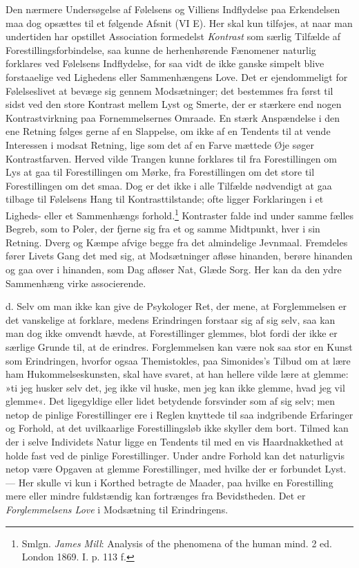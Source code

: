 \documentclass[12pt,a4paper,openany]{book}
\newcommand{\opage}[1]{\marginnote{\footnotesize\textit{[#1]}}}
\begin{document}
Den nærmere Undersøgelse af Følelsens og Villiens Indflydelse paa
Erkendelsen maa dog opsættes til et følgende Afsnit (VI E). Her skal kun
tilføjes, at naar man undertiden har opstillet Association formedelst
\emph{Kontrast} som særlig Tilfælde af Forestillingsforbindelse, saa
kunne de herhenhørende Fænomener naturlig forklares ved Følelsens
Indflydelse, for saa vidt de ikke ganske simpelt blive forstaaelige ved
Lighedens eller Sammenhængens Love. Det er ejendommeligt for
Følelseslivet at bevæge sig gennem Modsætninger; det bestemmes fra først
til sidst ved den store Kontrast mellem Lyst og Smerte, der er stærkere
end nogen Kontrastvirkning paa Fornemmelsernes Omraade. En stærk
Anspændelse i den ene Retning følges gerne af en Slappelse, om ikke af
en Tendents til at vende Interessen i modsat Retning, lige som det af en
Farve mættede Øje søger Kontrastfarven. Herved vilde Trangen kunne
forklares til fra Forestillingen om Lys at gaa til Forestillingen om
Mørke, fra Forestillingen om det store til Forestillingen om det smaa.
Dog er det ikke i alle Tilfælde nødvendigt at gaa tilbage til Følelsens
Hang til Kontrasttilstande; ofte ligger Forklaringen i et Ligheds- eller
et Sammenhængs%
\opage{196}forhold.\footnote[1]{Smlgn. \emph{James Mill}: Analysis of
the phenomena of the human mind. 2 ed. London 1869. I. p. 113 f.}
Kontraster falde ind under samme fælles Begreb, som to Poler, der fjerne
sig fra et og samme Midtpunkt, hver i sin Retning. Dverg og Kæmpe afvige
begge fra det almindelige Jevnmaal. Fremdeles fører Livets Gang det med
sig, at Modsætninger afløse hinanden, berøre hinanden og gaa over i
hinanden, som Dag afløser Nat, Glæde Sorg. Her kan da den ydre
Sammenhæng virke associerende.

d. Selv om man ikke kan give de Psykologer Ret, der mene, at
Forglemmelsen er det vanskelige at forklare, medens Erindringen forstaar
sig af sig selv, saa kan man dog ikke omvendt hævde, at Forestillinger
glemmes, blot fordi der ikke er særlige Grunde til, at de erindres.
Forglemmelsen kan være nok saa stor en Kunst som Erindringen, hvorfor
ogsaa Themistokles, paa Simonides’s Tilbud om at lære ham
Hukommelseskunsten, skal have svaret, at han hellere vilde lære at
glemme: »ti jeg husker selv det, jeg ikke vil huske, men jeg kan ikke
glemme, hvad jeg vil glemme«. Det ligegyldige eller lidet betydende
forsvinder som af sig selv; men netop de pinlige Forestillinger ere i
Reglen knyttede til saa indgribende Erfaringer og Forhold, at det
uvilkaarlige Forestillingsløb ikke skyller dem bort. Tilmed kan der i
selve Individets Natur ligge en Tendents til med en vis Haardnakkethed
at holde fast ved de pinlige Forestillinger. Under andre Forhold kan det
naturligvis netop være Opgaven at glemme Forestillinger, med hvilke der
er forbundet Lyst. --- Her skulle vi kun i Korthed betragte de Maader,
paa hvilke en Forestilling mere eller mindre fuldstændig kan fortrænges
fra Bevidstheden. Det er \emph{Forglemmelsens Love} i Modsætning til
Erindringens.
\end{document}
